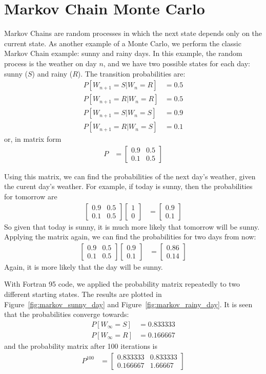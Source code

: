 \documentclass[twocolumn]{myarticle}
\newcommand{\mat}[1]{\begin{bmatrix}#1\end{bmatrix}}
\begin{document}
\section{Markov Chain Monte Carlo}
\label{sec:markov_chain_monte_carlo}

Markov Chains are random processes in which the next state depends only on the current state.
As another example of a Monte Carlo, we perform the classic Markov Chain example: sunny and rainy days.
In this example, the random process is the weather on day $ n $, and we have two possible states for each day: sunny ($ S $) and rainy ($ R $).
The transition probabilities are:
\begin{align}
    P[W_{n+1} = S | W_n = R] &= 0.5
    \\
    P[W_{n+1} = R | W_n = R] &= 0.5
    \\
    P[W_{n+1} = S | W_n = S] &= 0.9
    \\
    P[W_{n+1} = R | W_n = S] &= 0.1
\end{align}
or, in matrix form
\begin{align}
    P &= \mat{0.9 & 0.5 \\ 0.1 & 0.5}
\end{align}

Using this matrix, we can find the probabilities of the next day's weather, given the curent day's weather.
For example, if today is sunny, then the probabilities for tomorrow are
\begin{align}
    \mat{0.9 & 0.5 \\ 0.1 & 0.5} \mat{1 \\ 0} &= \mat{0.9 \\ 0.1}
\end{align}
So given that today is sunny, it is much more likely that tomorrow will be sunny.
Applying the matrix again, we can find the probabilities for two days from now:
\begin{align}
    \mat{0.9 & 0.5 \\ 0.1 & 0.5} \mat{0.9 \\ 0.1} &= \mat{0.86 \\ 0.14}
\end{align}
Again, it is more likely that the day will be sunny.

With Fortran 95 code, we applied the probability matrix repeatedly to two different starting states.
The results are plotted in Figure~\ref{fig:markov_sunny_day} and Figure~\ref{fig:markov_rainy_day}.
It is seen that the probabilities converge towards:
\begin{align}
    P[W_\infty = S] &= 0.833333
    \\
    P[W_\infty = R] &= 0.166667
\end{align}
and the probability matrix after 100 iterations is
\begin{align}
    P^{100} &= \mat{0.833333 & 0.833333 \\ 0.166667 & 1.66667}
\end{align}
\end{document}
